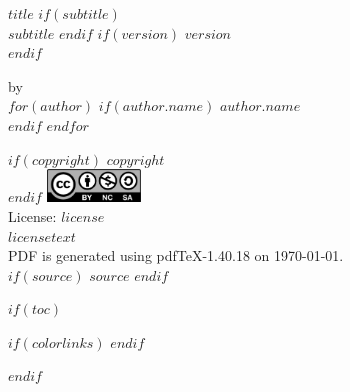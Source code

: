 \documentclass[10pt, letterpaper, titlepage, oneside, openright, final, article]{memoir}
\begin{document}

%
%
\thispagestyle{empty}
\begin{flushleft}
    {\bfseries $title$}
    $if(subtitle)$
        {\\\itshape $subtitle$}
    $endif$
    $if(version)$
        \normalsize $version$\\
    $endif$
    \vspace*{1em}

    \normalsize by\\
    $for(author)$
        $if(author.name)$
            \normalsize $author.name$\\
        $endif$
    $endfor$

    \vspace*{1.5em}

    $if(copyright)$
        \normalsize $copyright$\\[1.2em]
    $endif$
    \includegraphics[keepaspectratio=true, width=2.5cm]{cc_by_nc_sa_40.eps}\\[1em]
    \normalsize License: $license$\\[1em]
    \normalsize $licensetext$\\[1em]
    \normalsize PDF is generated using pdfTeX-1.40.18 on \today.\\[1em]
    $if(source)$
        \normalsize $source$
    $endif$
\end{flushleft}
\pagebreak

\cleardoublepage

%
%

%
%
$if(toc)$
{
    $if(colorlinks)$
        \hypersetup{linkcolor=$if(toccolor)$$toccolor$$else$$endif$}
    $endif$
    \cleardoublepage
    \begin{KeepFromToc} %
        \tableofcontents
    \end{KeepFromToc}
    \pagebreak
    \cleardoublepage
}
$endif$
\end{document}
